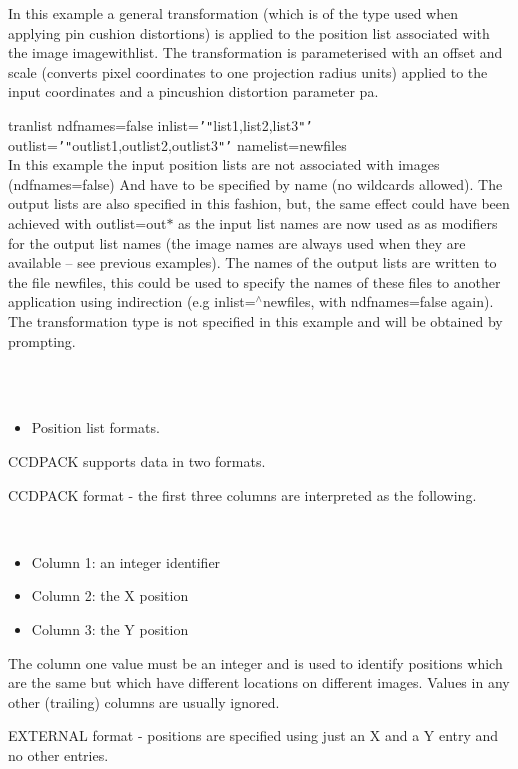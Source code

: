 \documentclass[twoside,11pt]{article}
\renewcommand{\_}{\texttt{\symbol{95}}}
\newcommand{\qt}[1]{{\tt "}#1{\tt "}}
\newcommand{\qs}[1]{{\tt '}#1{\tt '}}
\newcommand{\sstexamplesubsection}[2]{\sloppy \item{\ssttt #1} \mbox{} \\ #2 }
\newcommand{\sstnotes}[1]{\item[Notes:] \mbox{} \\[1.3ex] #1}
\newcommand{\sstitemlist}[1]{
  \mbox{} \\
  \vspace{-3.5ex}
  \begin{itemize}
     #1
  \end{itemize}
}
\newcommand{\sstitem}{\item}
\newcommand{\sstexamplesubsection}[2]{\item[{\ssttt #1}] #2}
\newcommand{\sstnotes}[1]{\item[Notes:] #1 }
\newcommand{\sstitemlist}[1]{
      \begin{itemize}
         #1
      \end{itemize}
      \\
   }
\newcommand{\sstitem}{\item}
\begin{document}
{{{         In this example a general transformation (which is of the type
         used when applying pin cushion distortions) is applied to the
         position list associated with the image image\_with\_list. The
         transformation is parameterised with an offset and scale
         (converts pixel coordinates to one projection radius units)
         applied to the input coordinates and a pincushion distortion
         parameter pa.
      }
      \sstexamplesubsection{
         tranlist ndfnames=false inlist=\qs{\qt{list1,list2,list3}}
               outlist=\qs{\qt{outlist1,outlist2,outlist3}} namelist=newfiles
      }{
         In this example the input position lists are not associated
         with images (ndfnames=false) And have to be specified by name
         (no wildcards allowed). The output lists are also specified in
         this fashion, but, the same effect could have been achieved
         with outlist=out$*$ as the input list names are now used as as
         modifiers for the output list names (the image names are always
         used when they are available -- see previous examples). The
         names of the output lists are written to the file newfiles,
         this could be used to specify the names of these files to
         another application using indirection (e.g inlist=$^\wedge$newfiles,
         with ndfnames=false again).  The transformation type is not
         specified in this example and will be obtained by prompting.
      }
   }
   \sstnotes{
      \sstitemlist{

         \sstitem
         Position list formats.

      }
        CCDPACK supports data in two formats.

        CCDPACK format - the first three columns are interpreted as the
        following.

      \sstitemlist{

         \sstitem
              Column 1: an integer identifier

         \sstitem
              Column 2: the X position

         \sstitem
              Column 3: the Y position

      }
        The column one value must be an integer and is used to identify
        positions which are the same but which have different locations
        on different images. Values in any other (trailing) columns are
        usually ignored.

        EXTERNAL format - positions are specified using just an X and
        a Y entry and no other entries.

}}
\end{document}
